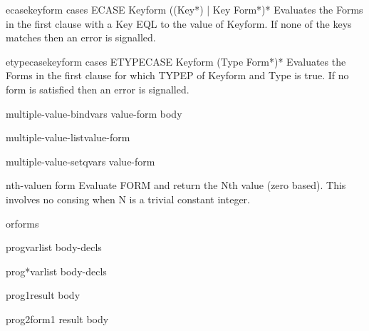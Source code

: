 \documentclass[10pt,english]{book}
\begin{document}
\begin{macro}{ecase}{keyform \body cases}
  ECASE Keyform {({(Key*) | Key} Form*)}*
  Evaluates the Forms in the first clause with a Key EQL to the value of
  Keyform. If none of the keys matches then an error is signalled.
\end{macro}

\begin{macro}{etypecase}{keyform \body cases}
  ETYPECASE Keyform {(Type Form*)}*
  Evaluates the Forms in the first clause for which TYPEP of Keyform and Type
  is true. If no form is satisfied then an error is signalled.
\end{macro}

\begin{macro}{multiple-value-bind}{vars value-form \body body}
  
\end{macro}

\begin{macro}{multiple-value-list}{value-form}
  
\end{macro}

\begin{macro}{multiple-value-setq}{vars value-form}
  
\end{macro}

\begin{macro}{nth-value}{n form}
  Evaluate FORM and return the Nth value (zero based). This involves no
  consing when N is a trivial constant integer.
\end{macro}

\begin{macro}{or}{\rest forms}
  
\end{macro}

\begin{macro}{prog}{varlist \body body-decls}
  
\end{macro}

\begin{macro}{prog*}{varlist \body body-decls}
  
\end{macro}

\begin{macro}{prog1}{result \body body}
  
\end{macro}

\begin{macro}{prog2}{form1 result \body body}
  
\end{macro}
\end{document}
